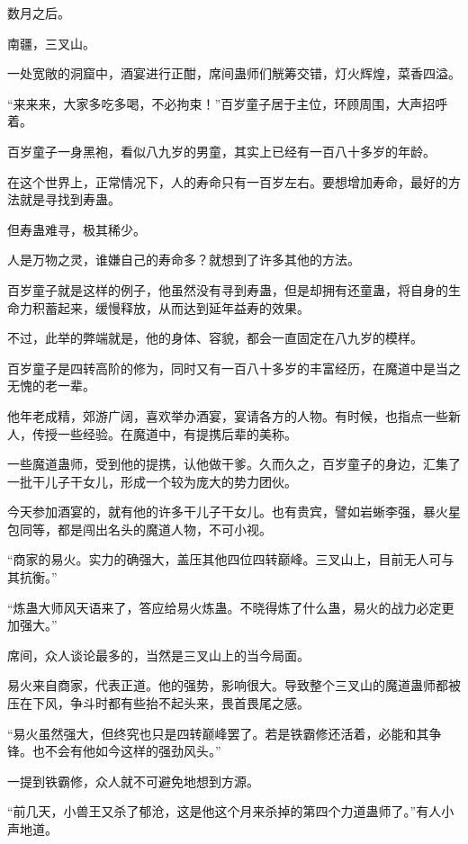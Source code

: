 
\begin{this_body}

数月之后。

南疆，三叉山。

一处宽敞的洞窟中，酒宴进行正酣，席间蛊师们觥筹交错，灯火辉煌，菜香四溢。

“来来来，大家多吃多喝，不必拘束！”百岁童子居于主位，环顾周围，大声招呼着。

百岁童子一身黑袍，看似八九岁的男童，其实上已经有一百八十多岁的年龄。

在这个世界上，正常情况下，人的寿命只有一百岁左右。要想增加寿命，最好的方法就是寻找到寿蛊。

但寿蛊难寻，极其稀少。

人是万物之灵，谁嫌自己的寿命多？就想到了许多其他的方法。

百岁童子就是这样的例子，他虽然没有寻到寿蛊，但是却拥有还童蛊，将自身的生命力积蓄起来，缓慢释放，从而达到延年益寿的效果。

不过，此举的弊端就是，他的身体、容貌，都会一直固定在八九岁的模样。

百岁童子是四转高阶的修为，同时又有一百八十多岁的丰富经历，在魔道中是当之无愧的老一辈。

他年老成精，郊游广阔，喜欢举办酒宴，宴请各方的人物。有时候，也指点一些新人，传授一些经验。在魔道中，有提携后辈的美称。

一些魔道蛊师，受到他的提携，认他做干爹。久而久之，百岁童子的身边，汇集了一批干儿子干女儿，形成一个较为庞大的势力团伙。

今天参加酒宴的，就有他的许多干儿子干女儿。也有贵宾，譬如岩蜥李强，暴火星包同等，都是闯出名头的魔道人物，不可小视。

“商家的易火。实力的确强大，盖压其他四位四转巅峰。三叉山上，目前无人可与其抗衡。”

“炼蛊大师风天语来了，答应给易火炼蛊。不晓得炼了什么蛊，易火的战力必定更加强大。”

席间，众人谈论最多的，当然是三叉山上的当今局面。

易火来自商家，代表正道。他的强势，影响很大。导致整个三叉山的魔道蛊师都被压在下风，争斗时都有些抬不起头来，畏首畏尾之感。

“易火虽然强大，但终究也只是四转巅峰罢了。若是铁霸修还活着，必能和其争锋。也不会有他如今这样的强劲风头。”

一提到铁霸修，众人就不可避免地想到方源。

“前几天，小兽王又杀了郁沧，这是他这个月来杀掉的第四个力道蛊师了。”有人小声地道。


\end{this_body}
